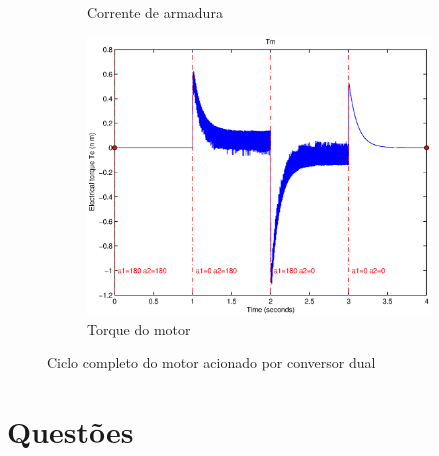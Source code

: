 \documentclass{article}
\begin{document}
\begin{figure}[H]
\begin{subfigure}[b]{0.49\linewidth}
		\caption{Corrente de armadura}
	\end{subfigure}
	\begin{subfigure}[b]{0.49\linewidth}
		\centering
		\includegraphics[width=\linewidth]{matlab/tm8}
		\caption{Torque do motor}
	\end{subfigure}
	\caption{Ciclo completo do motor acionado por conversor dual}
	\label{fig:res8}
\end{figure}
\section{Questões}
\end{document}
